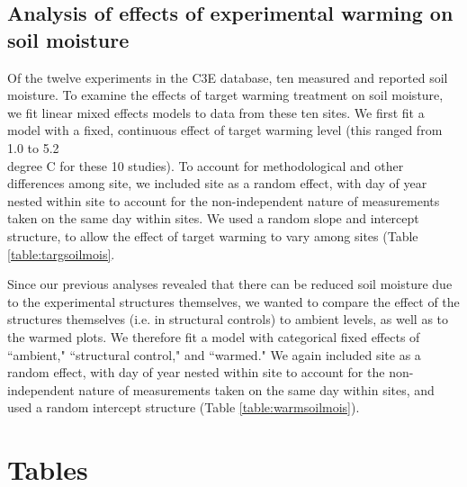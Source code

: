 \documentclass{article}
\begin{document}
\subsection* {Analysis of effects of experimental warming on soil moisture}
Of the twelve experiments in the C3E database, ten measured and reported soil moisture. To examine the effects of target warming treatment on soil moisture, we fit linear mixed effects models to data from these ten sites. We first fit a model with a fixed, continuous effect of target warming level (this ranged from 1.0 to 5.2 \\degree C for these 10 studies). To account for methodological and other differences among site, we included site as a random effect, with day of year nested within site to account for the non-independent nature of measurements taken on the same day within sites.  We used a random slope and intercept structure, to allow the effect of target warming to vary among sites (Table \ref{table:targsoilmois}. 
\par Since our previous analyses revealed that there can be reduced soil moisture due to the experimental structures themselves, we wanted to compare the effect of the structures themselves (i.e. in structural controls) to ambient levels, as well as to the warmed plots. We therefore fit a model with categorical fixed effects of ``ambient," ``structural control," and ``warmed."  We again included site as a random effect, with day of year nested within site to account for the non-independent nature of measurements taken on the same day within sites, and used a random intercept structure (Table \ref{table:warmsoilmois}). 


\clearpage


\section* {Tables}
\end{document}
